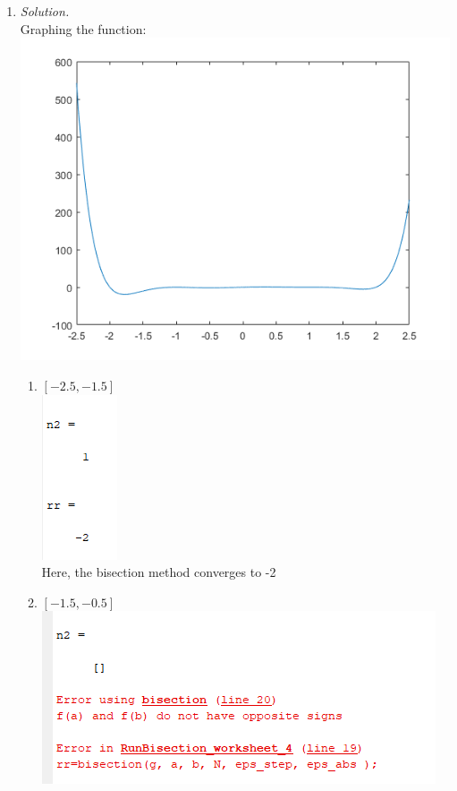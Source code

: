 \documentclass[12pt,letterpaper]{article}
\begin{document}
\begin{enumerate}
    \item \emph{Solution.}\\
    Graphing the function: \\
    \includegraphics{number2graph.png}
    \begin{enumerate}
        \item $\left [-2.5, -1.5 \right]$\\
        \includegraphics{2a.png}\\
        Here, the bisection method converges to -2
        \item $\left [-1.5, -0.5 \right]$\\
        \includegraphics{2b.png}\\

\end{enumerate}
\end{enumerate}
\end{document}
